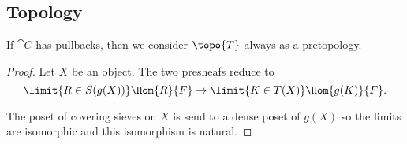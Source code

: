 \subsection{Topology}








If $\cat{C}$ has pullbacks, then we consider $\topo{T}$ always as a pretopology.


\begin{proof}
Let $X$ be an object.
The two presheafs reduce to
\[ \limit{R\in S(g(X))} \Hom{R}{F} \rightarrow \limit{K\in T(X)} \Hom{g(K)}{F}.\]

The poset of covering sieves on $X$ is send to a dense
poset of $g(X)$ so the limits are isomorphic and this isomorphism is natural.
\end{proof}

